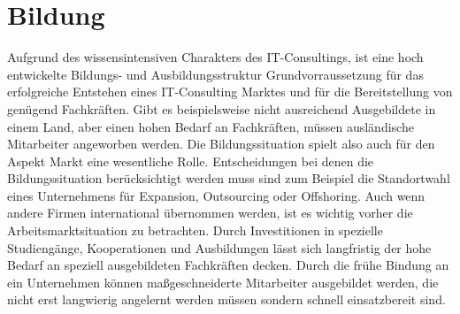 

\chapter{Bildung}
Aufgrund des wissensintensiven Charakters des IT-Consultings, ist eine hoch entwickelte Bildungs- und Ausbildungsstruktur Grundvorraussetzung für das erfolgreiche Entstehen eines IT-Consulting Marktes und für die Bereitstellung von genügend Fachkräften.
Gibt es beispielsweise nicht ausreichend Ausgebildete in einem Land, aber einen hohen Bedarf an Fachkräften, müssen ausländische Mitarbeiter angeworben werden. Die Bildungssituation spielt also auch für den Aspekt Markt eine wesentliche Rolle.
Entscheidungen bei denen die Bildungssituation berücksichtigt werden muss sind zum Beispiel die Standortwahl eines Unternehmens für Expansion, Outsourcing oder Offshoring. Auch wenn andere Firmen international übernommen werden, ist es wichtig vorher die Arbeitsmarktsituation zu betrachten. Durch Investitionen in spezielle Studiengänge, Kooperationen und Ausbildungen lässt sich langfristig der hohe Bedarf an speziell ausgebildeten Fachkräften decken. Durch die frühe Bindung an ein Unternehmen können maßgeschneiderte Mitarbeiter ausgebildet werden, die nicht erst langwierig angelernt werden müssen sondern schnell einsatzbereit sind.

